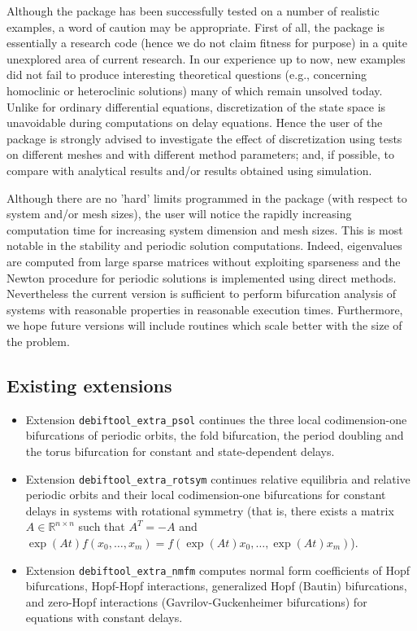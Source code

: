 \documentclass[10pt]{scrartcl}
\newcommand{\RR}{\mathbb{R}}
\begin{document}
{Although
the package has been successfully tested on a number of realistic examples,
a word of caution may be appropriate. First of all, the package
is essentially a research code (hence we do not
claim fitness for purpose) in a quite unexplored area of current
research. In our experience up to now, 
new examples did not fail to produce
interesting theoretical questions (e.g., concerning homoclinic
or heteroclinic solutions) many of which
remain unsolved today. 
Unlike for ordinary differential equations, discretization
of the state space is unavoidable during computations on
delay equations. Hence the user of the package is 
strongly advised 
to investigate the effect of discretization using tests on different
meshes and with different method parameters; and, if
possible, to compare with analytical results and/or results obtained
using simulation.

Although there are no 'hard' limits programmed in the package (with
respect to system and/or mesh sizes), the user will notice the rapidly
increasing computation time for increasing system dimension and mesh
sizes.  This is most notable in the stability and periodic solution
computations.  Indeed, eigenvalues are computed from large sparse
matrices without exploiting sparseness and the Newton procedure for
periodic solutions is implemented using direct methods.  Nevertheless
the current version is sufficient to perform bifurcation analysis of
systems with reasonable properties in reasonable execution times.
Furthermore, we hope future versions will include routines which scale
better with the size of the problem.

\subsection{Existing extensions}
\label{sec:extensions}
\begin{itemize}
\item Extension \texttt{debiftool\_extra\_psol} continues the three
  local co\-dim\-ension-one bifurcations of periodic orbits, the fold
  bifurcation, the period doubling and the torus bifurcation for
  constant and state-dependent delays.
\item Extension \texttt{debiftool\_extra\_rotsym} continues relative
  equilibria and relative periodic orbits and their local
  codimension-one bifurcations for constant delays in systems with
  rotational symmetry (that is, there exists a matrix
  $A\in\RR^{n\times n}$ such that $A^T=-A$ and
  $\exp(At)f(x_0,\ldots,x_m)=f(\exp(At)x_0,\ldots,\exp(At)x_m)$).
\item Extension \texttt{debiftool\_extra\_nmfm} computes normal form
  coefficients of Hopf bifurcations, Hopf-Hopf interactions,
  generalized Hopf (Bautin) bifurcations, and zero-Hopf interactions
  (Gavrilov-Guckenheimer bifurcations) for equations with constant
  delays.
\end{itemize}


}
\end{document}
